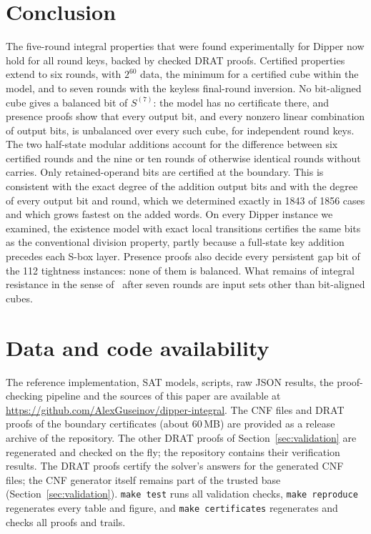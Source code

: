 \documentclass[11pt,a4paper]{article}
\theoremstyle{definition}
\theoremstyle{remark}
\newcommand{\repo}{\url{https://github.com/AlexGuseinov/dipper-integral}}
\begin{document}
\section{Conclusion}
The five-round integral properties that were found experimentally for Dipper now hold for all round keys, backed by checked DRAT proofs. Certified properties extend to six rounds, with $2^{60}$ data, the minimum for a certified cube within the model, and to seven rounds with the keyless final-round inversion. No bit-aligned cube gives a balanced bit of $S^{(7)}$: the model has no certificate there, and presence proofs show that every output bit, and every nonzero linear combination of output bits, is unbalanced over every such cube, for independent round keys. The two half-state modular additions account for the difference between six certified rounds and the nine or ten rounds of otherwise identical rounds without carries. Only retained-operand bits are certified at the boundary. This is consistent with the exact degree of the addition output bits and with the degree of every output bit and round, which we determined exactly in 1843 of 1856 cases and which grows fastest on the added words. On every Dipper instance we examined, the existence model with exact local transitions certifies the same bits as the conventional division property, partly because a full-state key addition precedes each S-box layer. Presence proofs also decide every persistent gap bit of the 112 tightness instances: none of them is balanced. What remains of integral resistance in the sense of~\cite{hebborn2021} after seven rounds are input sets other than bit-aligned cubes.

\section*{Data and code availability}
The reference implementation, SAT models, scripts, raw JSON results, the proof-checking pipeline and the sources of this paper are available at \repo{}. The CNF files and DRAT proofs of the boundary certificates (about 60\,MB) are provided as a release archive of the repository. The other DRAT proofs of Section~\ref{sec:validation} are regenerated and checked on the fly; the repository contains their verification results. The DRAT proofs certify the solver's answers for the generated CNF files; the CNF generator itself remains part of the trusted base (Section~\ref{sec:validation}). \texttt{make test} runs all validation checks, \texttt{make reproduce} regenerates every table and figure, and \texttt{make certificates} regenerates and checks all proofs and trails.
\end{document}
